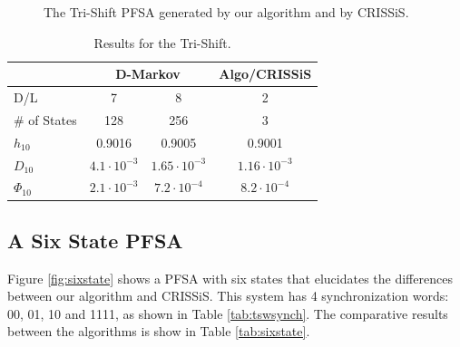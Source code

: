 {\begin{figure}
\centering
{}
\caption{The Tri-Shift PFSA generated by our algorithm and by CRISSiS.\label{fig:trishiftgen}}
\end{figure}

\begin{table}
\centering
\caption{Results for the Tri-Shift. \label{tab:trishift}}
\begin{tabular}{|l|c|c|c|}
\hline
 & \multicolumn{2}{c|}{\textbf{D-Markov}} & \textbf{Algo/CRISSiS}\\
 \hline
D/L & 7 & 8 & 2 \\
\hline
\# of States & 128 & 256 & 3 \\ 
$h_{10}$ & 0.9016 & 0.9005 & 0.9001 \\
$D_{10}$ & $4.1\cdot10^{-3}$ & $1.65\cdot10^{-3}$ & $1.16\cdot10^{-3}$ \\
$\Phi_{10}$ & $2.1\cdot10^{-3}$ & $7.2\cdot10^{-4}$ & $8.2\cdot10^{-4}$ \\
 \hline
\end{tabular}
\end{table}

\subsection{A Six State PFSA}

Figure \ref{fig:sixstate} shows a PFSA with six states that elucidates the differences between our algorithm and CRISSiS. This system has 4 synchronization words: 00, 01, 10 and 1111, as shown in Table \ref{tab:tswsynch}. The comparative results between the algorithms is show in Table \ref{tab:sixstate}.

}
